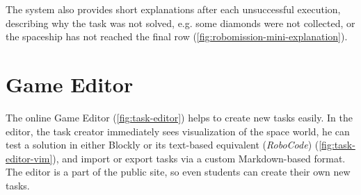 
The system also provides short explanations after each unsuccessful execution,
describing why the task was not solved,
e.g. some diamonds were not collected,
or the spaceship has not reached the final row
(\cref{fig:robomission-mini-explanation}).


\section{Game Editor}  %
\label{sec:robomission.task-editor}

The online Game Editor (\cref{fig:task-editor})
helps to create new tasks easily.
In the editor, the task creator immediately sees visualization of the space world,
he can test a solution in either Blockly or its text-based equivalent (\emph{RoboCode})
(\cref{fig:task-editor-vim}),
and import or export tasks via a custom Markdown-based format.
The editor is a part of the public site, so even students can create their own new tasks.


